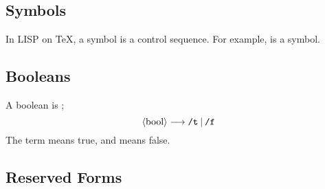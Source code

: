 \subsection{Symbols}
In LISP on \TeX, a symbol is a control sequence.
For example, \term{\string\somecs} is a symbol.

\subsection{Booleans}
A boolean is ;
\[
 \mathord{\langle\mbox{bool}\rangle} \longrightarrow \mathord{\mbox{\texttt{/t}}} \mathbin{\vert} \mathord{\mbox{\texttt{/f}}}
\]
The term  means true, and  means false.

\subsection{{\manual {}}Reserved Forms}